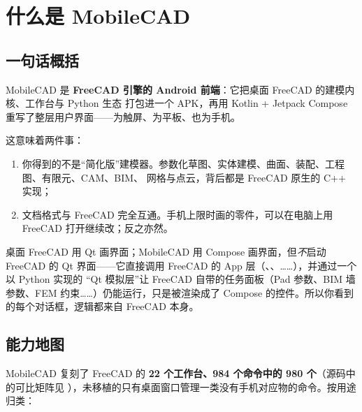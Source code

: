 \chapter{什么是 MobileCAD}

\section{一句话概括}

MobileCAD 是 \textbf{FreeCAD 引擎的 Android 前端}：它把桌面 FreeCAD 的建模内核、工作台与 Python 生态
打包进一个 APK，再用 Kotlin + Jetpack Compose 重写了整层用户界面——为触屏、为平板、也为手机。

这意味着两件事：

\begin{enumerate}
  \item 你得到的不是“简化版”建模器。参数化草图、实体建模、曲面、装配、工程图、有限元、CAM、BIM、
        网格与点云，背后都是 FreeCAD 原生的 C++ 实现；
  \item 文档格式与 FreeCAD 完全互通。手机上限时画的零件，可以在电脑上用 FreeCAD 打开继续改；反之亦然。
\end{enumerate}

\begin{tip}
桌面 FreeCAD 用 Qt 画界面；MobileCAD 用 Compose 画界面，但\emph{不}启动 FreeCAD 的 Qt 界面——它直接调用
FreeCAD 的 App 层（、、……），并通过一个以 Python 实现的
“Qt 模拟层”让 FreeCAD 自带的任务面板（Pad 参数、BIM 墙参数、FEM 约束……）仍能运行，只是被渲染成了
Compose 的控件。所以你看到的每个对话框，逻辑都来自 FreeCAD 本身。
\end{tip}

\section{能力地图}

MobileCAD 复刻了 FreeCAD 的 \textbf{22 个工作台、984 个命令中的 980 个}（源码中的可比矩阵见
），未移植的只有桌面窗口管理一类没有手机对应物的命令。按用途归类：

